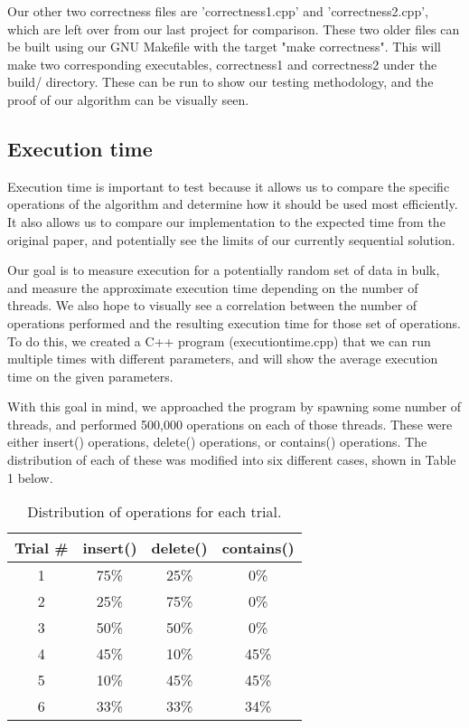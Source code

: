 \documentclass[journal]{IEEEtran}
\begin{document}
Our other two correctness files are 'correctness1.cpp' and 'correctness2.cpp', which are left over from our last project for comparison. These two older files can be built using our GNU Makefile with the target "make correctness". This will make two corresponding executables, correctness1 and correctness2 under the build/ directory. These can be run to show our testing methodology, and the proof of our algorithm can be visually seen.



\subsection{Execution time}

Execution time is important to test because it allows us to compare the specific operations of the algorithm and determine how it should be used most efficiently. It also allows us to compare our implementation to the expected time from the original paper, and potentially see the limits of our currently sequential solution.

Our goal is to measure execution for a potentially random set of data in bulk, and measure the approximate execution time depending on the number of threads. We also hope to visually see a correlation between the number of operations performed and the resulting execution time for those set of operations. To do this, we created a C++ program (executiontime.cpp) that we can run multiple times with different parameters, and will show the average execution time on the given parameters.

With this goal in mind, we approached the program by spawning some number of threads, and performed 500,000 operations on each of those threads. These were either insert() operations, delete() operations, or contains() operations. The distribution of each of these was modified into six different cases, shown in Table 1 below.

\begin{table}[h]
\centering
\begin{center}
\begin{tabular}{ |c|c|c|c| } 
 \hline
 Trial \# & insert() & delete() & contains() \\ 
 \hline
 1 & 75\% & 25\% & 0\% \\ 
 2 & 25\% & 75\% & 0\% \\ 
 3 & 50\% & 50\% & 0\% \\ 
 4 & 45\% & 10\% & 45\% \\ 
 5 & 10\% & 45\% & 45\% \\ 
 6 & 33\% & 33\% & 34\% \\ 
 \hline
\end{tabular}
\end{center}
\caption{Distribution of operations for each trial.}
\end{table}
\end{document}

